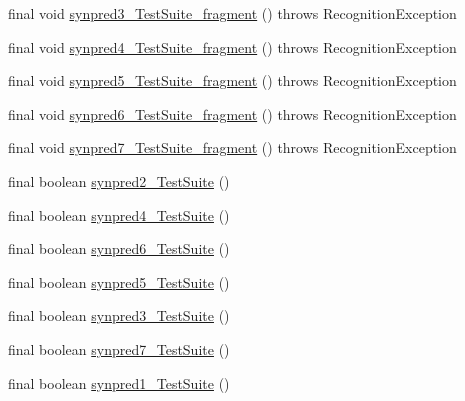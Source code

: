 \begin{DoxyCompactItemize}
final void \hyperlink{classorg_1_1tzi_1_1use_1_1parser_1_1testsuite_1_1_test_suite_parser_a6fdf4fb753d04add02be9fd499192349}{synpred3\-\_\-\-Test\-Suite\-\_\-fragment} ()  throws Recognition\-Exception 
\item 
final void \hyperlink{classorg_1_1tzi_1_1use_1_1parser_1_1testsuite_1_1_test_suite_parser_a597918af74b7b89aa49bbf9400389aeb}{synpred4\-\_\-\-Test\-Suite\-\_\-fragment} ()  throws Recognition\-Exception 
\item 
final void \hyperlink{classorg_1_1tzi_1_1use_1_1parser_1_1testsuite_1_1_test_suite_parser_a66488ef381e4c1d7d457850af7894b05}{synpred5\-\_\-\-Test\-Suite\-\_\-fragment} ()  throws Recognition\-Exception 
\item 
final void \hyperlink{classorg_1_1tzi_1_1use_1_1parser_1_1testsuite_1_1_test_suite_parser_a8b809f203ed2a7c979081a999aa318e9}{synpred6\-\_\-\-Test\-Suite\-\_\-fragment} ()  throws Recognition\-Exception 
\item 
final void \hyperlink{classorg_1_1tzi_1_1use_1_1parser_1_1testsuite_1_1_test_suite_parser_a9bfde32568355134a02cbb639297fafe}{synpred7\-\_\-\-Test\-Suite\-\_\-fragment} ()  throws Recognition\-Exception 
\item 
final boolean \hyperlink{classorg_1_1tzi_1_1use_1_1parser_1_1testsuite_1_1_test_suite_parser_ab75a350767059d31bb30365fa2162b02}{synpred2\-\_\-\-Test\-Suite} ()
\item 
final boolean \hyperlink{classorg_1_1tzi_1_1use_1_1parser_1_1testsuite_1_1_test_suite_parser_a5c41f74c9d371d3fa8690ee80657ff83}{synpred4\-\_\-\-Test\-Suite} ()
\item 
final boolean \hyperlink{classorg_1_1tzi_1_1use_1_1parser_1_1testsuite_1_1_test_suite_parser_a2228f87602a825817fc21509b558c902}{synpred6\-\_\-\-Test\-Suite} ()
\item 
final boolean \hyperlink{classorg_1_1tzi_1_1use_1_1parser_1_1testsuite_1_1_test_suite_parser_a4e425e0e80a2ca747f24f4d39569583c}{synpred5\-\_\-\-Test\-Suite} ()
\item 
final boolean \hyperlink{classorg_1_1tzi_1_1use_1_1parser_1_1testsuite_1_1_test_suite_parser_a4048e166aaffab190e12dcee0e0c5e28}{synpred3\-\_\-\-Test\-Suite} ()
\item 
final boolean \hyperlink{classorg_1_1tzi_1_1use_1_1parser_1_1testsuite_1_1_test_suite_parser_aa8b26198ca7a01e5a4cbf9b40f045d4a}{synpred7\-\_\-\-Test\-Suite} ()
\item 
final boolean \hyperlink{classorg_1_1tzi_1_1use_1_1parser_1_1testsuite_1_1_test_suite_parser_af8e2b15c1131a44ea1435edc9b404fd6}{synpred1\-\_\-\-Test\-Suite} ()
\end{DoxyCompactItemize}
